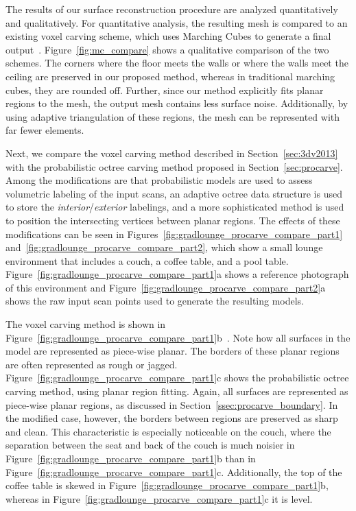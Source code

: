\documentclass[12pt,onecolumn,oneside]{book}
\begin{document}
The results of our surface reconstruction procedure are analyzed quantitatively and qualitatively.  For quantitative analysis, the resulting mesh is compared to an existing voxel carving scheme, which uses Marching Cubes to generate a final output~\cite{Carving}.  Figure~\ref{fig:mc_compare} shows a qualitative comparison of the two schemes.  The corners where the floor meets the walls or where the walls meet the ceiling are preserved in our proposed method, whereas in traditional marching cubes, they are rounded off.  Further, since our method explicitly fits planar regions to the mesh, the output mesh contains less surface noise.  Additionally, by using adaptive triangulation of these regions, the mesh can be represented with far fewer elements.

Next, we compare the voxel carving method described in Section~\ref{sec:3dv2013} with the probabilistic octree carving method proposed in Section~\ref{sec:procarve}.  Among the modifications are that probabilistic models are used to assess volumetric labeling of the input scans, an adaptive octree data structure is used to store the {\it interior}/{\it exterior} labelings, and a more sophisticated method is used to position the intersecting vertices between planar regions.  The effects of these modifications can be seen in Figures~\ref{fig:gradlounge_procarve_compare_part1} and~\ref{fig:gradlounge_procarve_compare_part2}, which show a small lounge environment that includes a couch, a coffee table, and a pool table.  Figure~\ref{fig:gradlounge_procarve_compare_part1}a shows a reference photograph of this environment and Figure~\ref{fig:gradlounge_procarve_compare_part2}a shows the raw input scan points used to generate the resulting models.  

The voxel carving method is shown in Figure~\ref{fig:gradlounge_procarve_compare_part1}b~\cite{Turner13}.  Note how all surfaces in the model are represented as piece-wise planar.  The borders of these planar regions are often represented as rough or jagged.  Figure~\ref{fig:gradlounge_procarve_compare_part1}c shows the probabilistic octree carving method, using planar region fitting.  Again, all surfaces are represented as piece-wise planar regions, as discussed in Section~\ref{ssec:procarve_boundary}.  In the modified case, however, the borders between regions are preserved as sharp and clean.  This characteristic is especially noticeable on the couch, where the separation between the seat and back of the couch is much noisier in Figure~\ref{fig:gradlounge_procarve_compare_part1}b than in Figure~\ref{fig:gradlounge_procarve_compare_part1}c.  Additionally, the top of the coffee table is skewed in Figure~\ref{fig:gradlounge_procarve_compare_part1}b, whereas in Figure~\ref{fig:gradlounge_procarve_compare_part1}c it is level.
\end{document}
